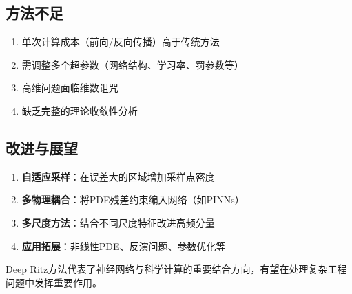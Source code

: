 \documentclass{article}
\begin{document}
\subsection{方法不足}

\begin{enumerate}
  \item 单次计算成本（前向/反向传播）高于传统方法
  \item 需调整多个超参数（网络结构、学习率、罚参数等）
  \item 高维问题面临维数诅咒
  \item 缺乏完整的理论收敛性分析
\end{enumerate}

\subsection{改进与展望}

\begin{enumerate}
  \item \textbf{自适应采样}：在误差大的区域增加采样点密度
  \item \textbf{多物理耦合}：将PDE残差约束编入网络（如PINNs）
  \item \textbf{多尺度方法}：结合不同尺度特征改进高频分量
  \item \textbf{应用拓展}：非线性PDE、反演问题、参数优化等
\end{enumerate}

Deep Ritz方法代表了神经网络与科学计算的重要结合方向，有望在处理复杂工程问题中发挥重要作用。



\end{document}
